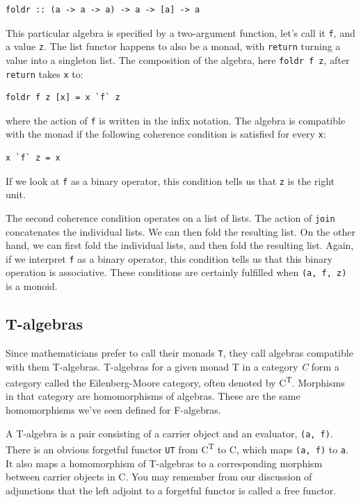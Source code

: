 \begin{verbatim}
foldr :: (a -> a -> a) -> a -> [a] -> a
\end{verbatim}

This particular algebra is specified by a two-argument function, let's
call it \texttt{f}, and a value \texttt{z}. The list functor happens to
also be a monad, with \texttt{return} turning a value into a singleton
list. The composition of the algebra, here \texttt{foldr\ f\ z}, after
\texttt{return} takes \texttt{x} to:

\begin{verbatim}
foldr f z [x] = x `f` z
\end{verbatim}

where the action of \texttt{f} is written in the infix notation. The
algebra is compatible with the monad if the following coherence
condition is satisfied for every \texttt{x}:

\begin{verbatim}
x `f` z = x
\end{verbatim}

If we look at \texttt{f} as a binary operator, this condition tells us
that \texttt{z} is the right unit.

The second coherence condition operates on a list of lists. The action
of \texttt{join} concatenates the individual lists. We can then fold the
resulting list. On the other hand, we can first fold the individual
lists, and then fold the resulting list. Again, if we interpret
\texttt{f} as a binary operator, this condition tells us that this
binary operation is associative. These conditions are certainly
fulfilled when \texttt{(a,\ f,\ z)} is a monoid.

\subsection{T-algebras}\label{t-algebras}

Since mathematicians prefer to call their monads \texttt{T}, they call
algebras compatible with them T-algebras. T-algebras for a given monad T
in a category \emph{C} form a category called the Eilenberg-Moore
category, often denoted by C\textsuperscript{T}. Morphisms in that
category are homomorphisms of algebras. These are the same homomorphisms
we've seen defined for F-algebras.

A T-algebra is a pair consisting of a carrier object and an evaluator,
\texttt{(a,\ f)}. There is an obvious forgetful functor \texttt{UT} from
C\textsuperscript{T} to C, which maps \texttt{(a,\ f)} to \texttt{a}. It
also maps a homomorphism of T-algebras to a corresponding morphism
between carrier objects in C. You may remember from our discussion of
adjunctions that the left adjoint to a forgetful functor is called a
free functor.

